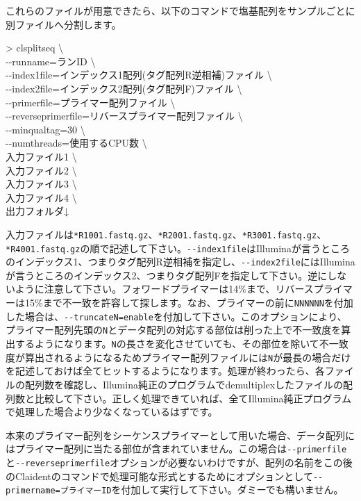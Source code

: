 \documentclass[titlepage,10pt,a4paper]{jsbook}
\newenvironment{cmd}{\begin{oframed}\raggedright\ttfamily\footnotesize\setlength{\baselineskip}{1.4em}}{\end{oframed}\vspace{-1em}}
\begin{document}
これらのファイルが用意できたら、以下のコマンドで塩基配列をサンプルごとに別ファイルへ分割します。
\begin{cmd}
{\textgreater} clsplitseq {\textbackslash}\\
{-}{-}runname=ランID {\textbackslash}\\
{-}{-}index1file=インデックス1配列(タグ配列R逆相補)ファイル {\textbackslash}\\
{-}{-}index2file=インデックス2配列(タグ配列F)ファイル {\textbackslash}\\
{-}{-}primerfile=プライマー配列ファイル {\textbackslash}\\
{-}{-}reverseprimerfile=リバースプライマー配列ファイル {\textbackslash}\\
{-}{-}minqualtag=30 {\textbackslash}\\
{-}{-}numthreads=使用するCPU数 {\textbackslash}\\
入力ファイル1 {\textbackslash}\\
入力ファイル2 {\textbackslash}\\
入力ファイル3 {\textbackslash}\\
入力ファイル4 {\textbackslash}\\
出力フォルダ↓
\end{cmd}
入力ファイルは\texttt{*{\textunderscore}R1{\textunderscore}001.fastq.gz}、\texttt{*{\textunderscore}R2{\textunderscore}001.fastq.gz}、\texttt{*{\textunderscore}R3{\textunderscore}001.fastq.gz}、\texttt{*{\textunderscore}R4{\textunderscore}001.fastq.gz}の順で記述して下さい。\texttt{{-}{-}index1file}はIlluminaが言うところのインデックス1、つまりタグ配列R逆相補を指定し、\texttt{{-}{-}index2file}にはIlluminaが言うところのインデックス2、つまりタグ配列Fを指定して下さい。逆にしないように注意して下さい。フォワードプライマーは14\%まで、リバースプライマーは15\%まで不一致を許容して探します。なお、プライマーの前に\texttt{NNNNNN}を付加した場合は、\texttt{{-}{-}truncateN=enable}を付加して下さい。このオプションにより、プライマー配列先頭の\texttt{N}とデータ配列の対応する部位は削った上で不一致度を算出するようになります。\texttt{N}の長さを変化させていても、その部位を除いて不一致度が算出されるようになるためプライマー配列ファイルには\texttt{N}が最長の場合だけを記述しておけば全てヒットするようになります。処理が終わったら、各ファイルの配列数を確認し、Illumina純正のプログラムでdemultiplexしたファイルの配列数と比較して下さい。正しく処理できていれば、全てIllumina純正プログラムで処理した場合より少なくなっているはずです。

本来のプライマー配列をシーケンスプライマーとして用いた場合、データ配列にはプライマー配列に当たる部位が含まれていません。この場合は\texttt{{-}{-}primerfile}と\texttt{{-}{-}reverseprimerfile}オプションが必要ないわけですが、配列の名前をこの後のClaidentのコマンドで処理可能な形式とするためにオプションとして\texttt{{-}{-}primername=プライマーID}を付加して実行して下さい。ダミーでも構いません。
\end{document}
